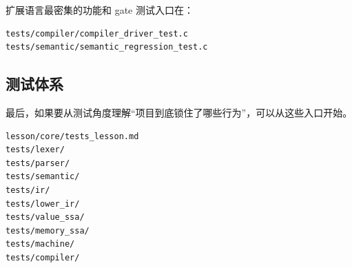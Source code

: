 \documentclass[UTF8,a4paper,11pt]{ctexart}
\begin{document}
扩展语言最密集的功能和 gate 测试入口在：

\begin{lstlisting}[language={}]
tests/compiler/compiler_driver_test.c
tests/semantic/semantic_regression_test.c
\end{lstlisting}

\subsection{测试体系}

最后，如果要从测试角度理解“项目到底锁住了哪些行为”，可以从这些入口开始。

\begin{lstlisting}[language={}]
lesson/core/tests_lesson.md
tests/lexer/
tests/parser/
tests/semantic/
tests/ir/
tests/lower_ir/
tests/value_ssa/
tests/memory_ssa/
tests/machine/
tests/compiler/
\end{lstlisting}
\end{document}
